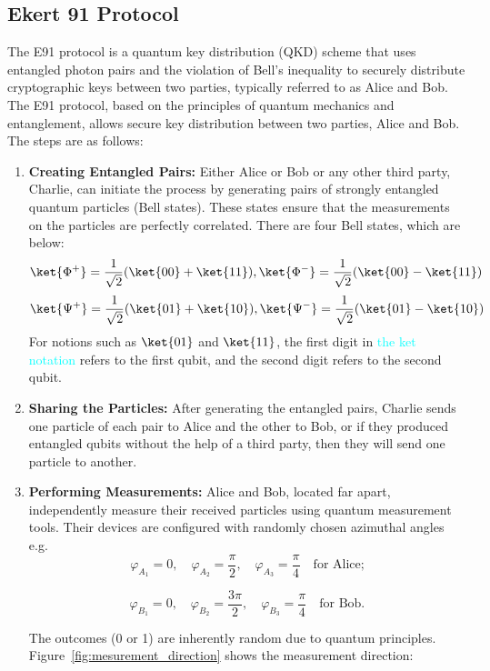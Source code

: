 \documentclass[a4paper]{cas-sc}
\begin{document}
\subsection{Ekert 91 Protocol}
\label{sec:e91}
The E91 protocol is a quantum key distribution (QKD) scheme that uses entangled photon pairs and the violation of Bell's inequality to securely distribute cryptographic keys between two parties, typically referred to as Alice and Bob. The E91 protocol, based on the principles of quantum mechanics and entanglement, allows secure key distribution between two parties, Alice and Bob. The steps are as follows:
\begin{enumerate}
    \item \textbf{Creating Entangled Pairs:} Either Alice or Bob or any other third party, Charlie, can initiate the process by generating pairs of strongly entangled quantum particles (Bell states). These states ensure that the measurements on the particles are perfectly correlated. There are four Bell states, which are below:
          \[\ket{\Phi^{+}}=\frac{1}{\sqrt{2}}(\ket{00}+\ket{11}),\ket{\Phi^{-}}=\frac{1}{\sqrt{2}}(\ket{00}-\ket{11})\]
          \[\ket{\Psi^{+}}=\frac{1}{\sqrt{2}}(\ket{01}+\ket{10}),\ket{\Psi^{-}}=\frac{1}{\sqrt{2}}(\ket{01}-\ket{10})\]
          For notions such as $\ket{01}$ and \textcolor{cyan}{$\ket{11}$}, the first digit in \textcolor{cyan}{the ket notation} refers to the first qubit, and the second digit refers to the second qubit.

    \item \textbf{Sharing the Particles:} After generating the entangled pairs, Charlie sends one particle of each pair to Alice and the other to Bob, or if they produced entangled qubits without the help of a third party, then they will send one particle to another.
    \item \textbf{Performing Measurements:} Alice and Bob, located far apart, independently measure their received particles using quantum measurement tools. Their devices are configured with randomly chosen azimuthal angles e.g.  \[
              \varphi_{A_1} = 0, \quad \varphi_{A_2} = \frac{\pi}{2}, \quad \varphi_{A_3} = \frac{\pi}{4} \quad \text{for Alice;}
          \]

          \[
              \varphi_{B_1} = 0, \quad \varphi_{B_2} = \frac{3\pi}{2}, \quad \varphi_{B_3} = \frac{\pi}{4} \quad \text{for Bob.}
          \]

          The outcomes (0 or 1) are inherently random due to quantum principles.
          Figure~\ref{fig:mesurement_direction} shows the measurement direction:


\end{enumerate}
\end{document}
